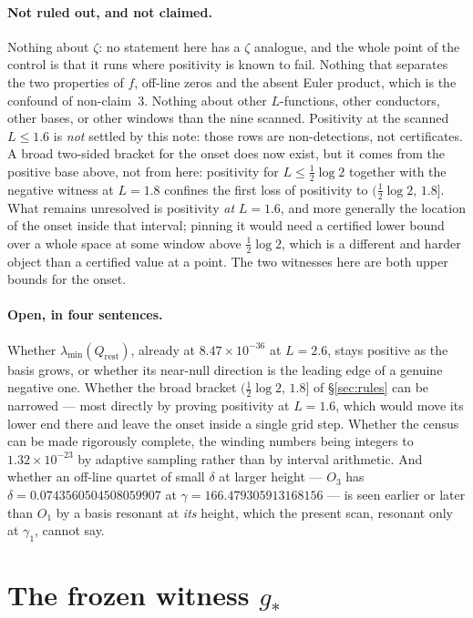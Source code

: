 \documentclass[11pt,a4paper]{article}
\theoremstyle{definition}
\theoremstyle{remark}
\newcommand{\lmin}{\lambda_{\min}}
\newcommand{\Qrest}{Q_{\mathrm{rest}}}
\begin{document}
\paragraph{Not ruled out, and not claimed.} Nothing about $\zeta$: no statement here has a
$\zeta$ analogue, and the whole point of the control is that it runs where positivity is
known to fail. Nothing that separates the two properties of $f$, off-line zeros and the
absent Euler product, which is the confound of non-claim~3. Nothing about other
$L$-functions, other conductors, other bases, or other windows than the nine scanned.
Positivity at the scanned $L\le1.6$ is \emph{not} settled by this note: those rows are
non-detections, not certificates. A broad two-sided bracket for the onset does now
exist, but it comes from the positive base above, not from here: positivity for
$L\le\tfrac12\log2$ together with the negative witness at $L=1.8$ confines the first loss
of positivity to $(\tfrac12\log2,\,1.8]$. What remains unresolved is positivity
\emph{at} $L=1.6$, and more generally the location of the onset inside that interval;
pinning it would need a certified lower bound over a whole space at some window above
$\tfrac12\log2$, which is a different and harder object than a certified value at a
point. The two witnesses here are both upper bounds for the onset.

\paragraph{Open, in four sentences.} Whether $\lmin(\Qrest)$, already at
$8.47\times10^{-36}$ at $L=2.6$, stays positive as the basis grows, or whether its
near-null direction is the leading edge of a genuine negative one. Whether the broad
bracket $(\tfrac12\log2,\,1.8]$ of \S\ref{sec:rules} can be narrowed --- most
directly by proving positivity at $L = 1.6$, which would move its lower end there and
leave the onset inside a single grid step. Whether the census can be made rigorously complete, the winding numbers
being integers to $1.32\times10^{-23}$ by adaptive sampling rather than by interval
arithmetic. And whether an off-line quartet of small $\delta$ at larger height --- $O_3$
has $\delta = 0.0743560504508059907$ at $\gamma = 166.479305913168156$ --- is seen earlier
or later than $O_1$ by a basis resonant at \emph{its} height, which the present scan,
resonant only at $\gamma_1$, cannot say.

\appendix

\section{The frozen witness $g_*$}\label{app:witness}
\end{document}

